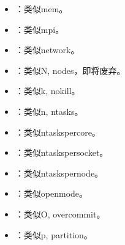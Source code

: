 \documentclass[a4paper,12pt,english]{sphinxmanual}
\begin{document}
\begin{itemize}
\item {} 
\sphinxAtStartPar
{}：类似\sphinxhyphen{}\sphinxhyphen{}mem。

\item {} 
\sphinxAtStartPar
{}：类似\sphinxhyphen{}\sphinxhyphen{}mpi。

\item {} 
\sphinxAtStartPar
{}：类似\sphinxhyphen{}\sphinxhyphen{}network。

\item {} 
\sphinxAtStartPar
{}：类似\sphinxhyphen{}N, \sphinxhyphen{}\sphinxhyphen{}nodes，即将废弃。

\item {} 
\sphinxAtStartPar
{}：类似\sphinxhyphen{}k, \sphinxhyphen{}\sphinxhyphen{}no\sphinxhyphen{}kill。

\item {} 
\sphinxAtStartPar
{}：类似\sphinxhyphen{}n, \sphinxhyphen{}\sphinxhyphen{}ntasks。

\item {} 
\sphinxAtStartPar
{}：类似\sphinxhyphen{}\sphinxhyphen{}ntasks\sphinxhyphen{}per\sphinxhyphen{}core。

\item {} 
\sphinxAtStartPar
{}：类似\sphinxhyphen{}\sphinxhyphen{}ntasks\sphinxhyphen{}per\sphinxhyphen{}socket。

\item {} 
\sphinxAtStartPar
{}：类似\sphinxhyphen{}\sphinxhyphen{}ntasks\sphinxhyphen{}per\sphinxhyphen{}node。

\item {} 
\sphinxAtStartPar
{}：类似\sphinxhyphen{}\sphinxhyphen{}open\sphinxhyphen{}mode。

\item {} 
\sphinxAtStartPar
{}：类似\sphinxhyphen{}O, \sphinxhyphen{}\sphinxhyphen{}overcommit。

\item {} 
\sphinxAtStartPar
{}：类似\sphinxhyphen{}p, \sphinxhyphen{}\sphinxhyphen{}partition。


\end{itemize}
\end{document}
